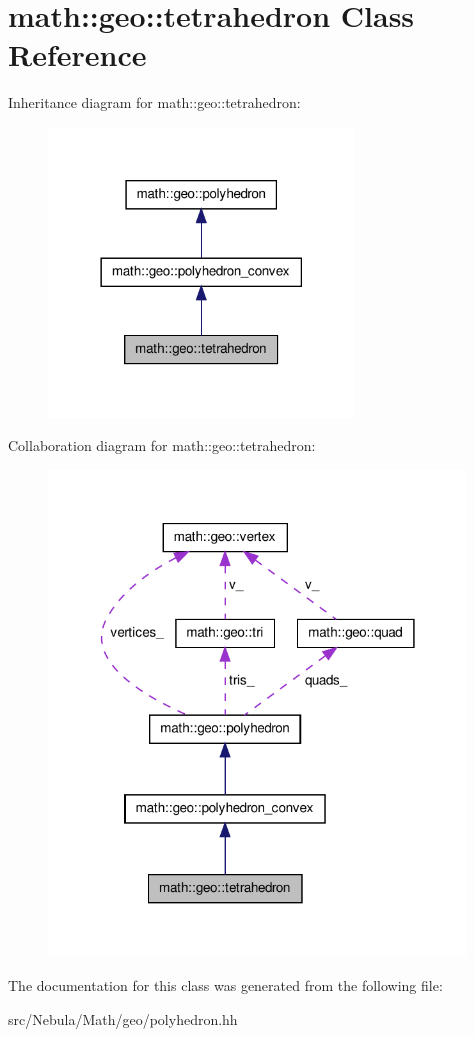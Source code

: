 \hypertarget{classmath_1_1geo_1_1tetrahedron}{\section{math\-:\-:geo\-:\-:tetrahedron \-Class \-Reference}
\label{classmath_1_1geo_1_1tetrahedron}
}


\-Inheritance diagram for math\-:\-:geo\-:\-:tetrahedron\-:\nopagebreak
\begin{figure}[H]
\begin{center}
\leavevmode
\includegraphics[width=230pt]{classmath_1_1geo_1_1tetrahedron__inherit__graph}
\end{center}
\end{figure}


\-Collaboration diagram for math\-:\-:geo\-:\-:tetrahedron\-:\nopagebreak
\begin{figure}[H]
\begin{center}
\leavevmode
\includegraphics[width=314pt]{classmath_1_1geo_1_1tetrahedron__coll__graph}
\end{center}
\end{figure}


\-The documentation for this class was generated from the following file\-:\begin{DoxyCompactItemize}
\item 
src/\-Nebula/\-Math/geo/polyhedron.\-hh\end{DoxyCompactItemize}
